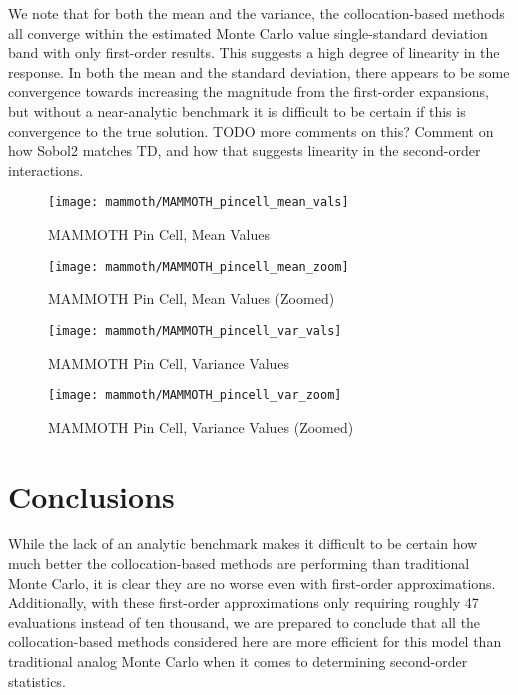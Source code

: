We note that for both the mean and the variance, the collocation-based methods all converge within the
estimated Monte Carlo value single-standard deviation band with only first-order results.  This suggests a
high degree of linearity in the response.  In both the mean and the standard deviation, there appears to be
some convergence towards increasing the magnitude from the first-order expansions, but without a near-analytic
benchmark it is difficult to be certain if this is convergence to the true solution.  TODO more comments on
this?  Comment on how Sobol2 matches TD, and how that suggests linearity in the second-order interactions.
\begin{figure}[htb]
  \centering
  \texttt{[image: mammoth/MAMMOTH\_pincell\_mean\_vals]}
  \caption{MAMMOTH Pin Cell, Mean Values}
  \label{fig:mammoth mean}
\end{figure}
\begin{figure}[htb]
  \centering
  \texttt{[image: mammoth/MAMMOTH\_pincell\_mean\_zoom]}
  \caption{MAMMOTH Pin Cell, Mean Values (Zoomed)}
  \label{fig:mammoth mean zoom}
\end{figure}
\begin{figure}[htb]
  \centering
  \texttt{[image: mammoth/MAMMOTH\_pincell\_var\_vals]}
  \caption{MAMMOTH Pin Cell, Variance Values}
  \label{fig:mammoth var}
\end{figure}
\begin{figure}[htb]
  \centering
  \texttt{[image: mammoth/MAMMOTH\_pincell\_var\_zoom]}
  \caption{MAMMOTH Pin Cell, Variance Values (Zoomed)}
  \label{fig:mammoth var zoom}
\end{figure}

\section{Conclusions}
While the lack of an analytic benchmark makes it difficult to be certain how much better the collocation-based
methods are performing than traditional Monte Carlo, it is clear they are no worse even with first-order
approximations.  Additionally, with these first-order approximations only requiring roughly 47 evaluations
instead of ten thousand, we are prepared to conclude that all the collocation-based methods considered here
are more efficient for this model than traditional analog Monte Carlo when it comes to determining
second-order statistics.

%
%
